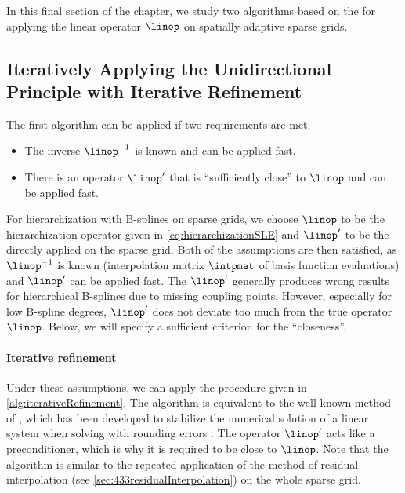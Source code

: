\label{sec:45spatAdaptiveUP}

In this final section of the chapter,
we study two algorithms based on the \up
for applying the linear operator $\linop$ on spatially adaptive sparse grids.



\subsection{%
  Iteratively Applying the Unidirectional Principle with Iterative Refinement%
}
\label{sec:451iterativeRefinement}

The first algorithm can be applied if two requirements are met:
\begin{itemize}
  \item
  The inverse $\linop^{-1}$ is known and can be applied fast.
  
  \item
  There is an operator $\linop'$
  that is ``sufficiently close'' to $\linop$ and can be applied fast.
\end{itemize}
For hierarchization with B-splines on sparse grids,
we choose $\linop$ to be the hierarchization
operator given in \cref{eq:hierarchizationSLE} and
$\linop'$ to be the \up directly applied on the
sparse grid.
Both of the assumptions are then satisfied,
as $\linop^{-1}$ is known
(interpolation matrix $\intpmat$ of basis function evaluations)
and $\linop'$ can be applied fast.
The \up $\linop'$ generally produces wrong
results for hierarchical B-splines due to missing coupling points.
However, especially for low B-spline degrees,
$\linop'$ does not deviate too much from the true operator $\linop$.
Below, we will specify a sufficient criterion for the ``closeness''.

\paragraph{Iterative refinement}

Under these assumptions, we can apply the procedure given in
\cref{alg:iterativeRefinement}.
The algorithm is equivalent to the well-known method of
, which has been developed to
stabilize the numerical solution of a linear system when solving
with rounding errors \cite{Higham02Accuracy}.
The operator $\linop'$ acts like a preconditioner,
which is why it is required to be close to $\linop$.
Note that the algorithm is similar to the repeated application
of the method of residual interpolation
(see \cref{sec:433residualInterpolation}) on the whole sparse grid.

